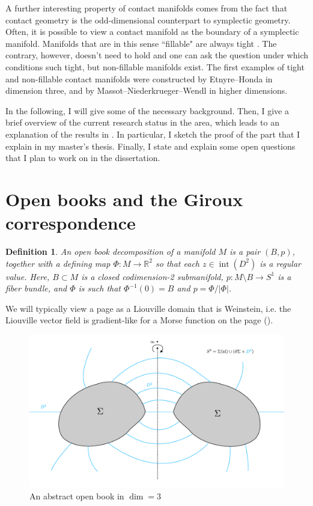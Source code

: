 \documentclass[a4paper]{amsart}
\newtheorem{definition}{Definition}
\begin{document}
A further interesting property of contact manifolds comes from the fact that contact geometry is the odd-dimensional counterpart to symplectic geometry. Often, it is possible to view a contact manifold as the boundary of a symplectic manifold. Manifolds that are in this sense ``fillable" are always tight \cite{Gromov85,Eliashberg91}.
The contrary, however, doesn't need to hold and one can ask the question under which conditions such tight, but non-fillable manifolds exist. The first examples of tight and non-fillable contact manifolds were constructed by Etnyre--Honda \cite{EH02} in dimension three, and by Massot--Niederkrueger--Wendl \cite{MNW13} in higher dimensions.


In the following, I will give some of the necessary background.
Then, I give a brief overview of the current research status in the area, which leads
to an explanation of the results in \cite{BGMZ22}.
In particular, I sketch the proof of the part that I explain in my master's thesis. 
Finally, I state and explain some open questions that I plan to work on in the dissertation.

\section*{Open books and the Giroux correspondence}
\begin{definition}
    An open book decomposition of a manifold $M$ is a pair $(B, p)$, together with a defining map $\Phi:M \to \mathbb R^2$ so that each $z \in \operatorname{int}(D^2)$ is a regular value.
    Here, $B \subset M$ is a closed codimension-2 submanifold, $p: M\setminus B \to S^1$ is a fiber bundle, and $\Phi$ is such that $\Phi^{-1}(0) = B$ and $p =  \Phi / |\Phi|$.
\end{definition}
We will typically view a page as a Liouville domain that is Weinstein, i.e. the Liouville vector field is gradient-like for a Morse function on the page (\cite[Def 1.1.2]{BHH23}).


\begin{figure}
    \includegraphics*[width=\textwidth]{../document/images/abstract_open_book.pdf}
    \caption{An abstract open book in $\dim = 3$}
    \label{fig:abstract_open_book}
\end{figure}
\end{document}
